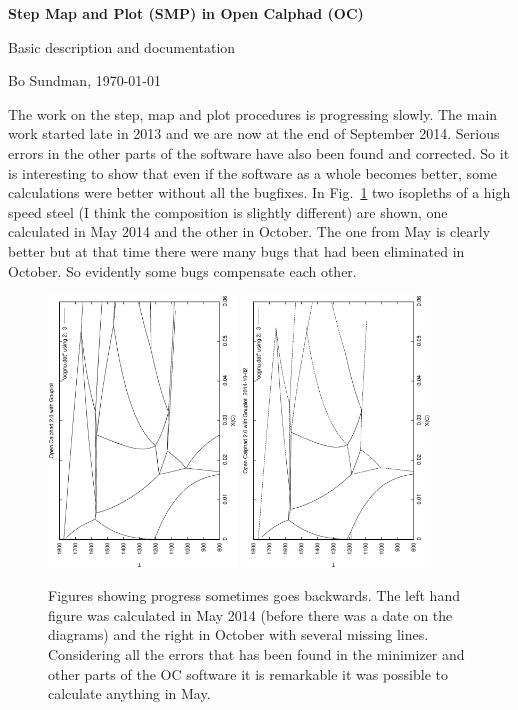\documentclass[12pt]{article}
\begin{document}
\begin{center}

{\Large \bf Step Map and Plot (SMP) in Open Calphad (OC)}

{\large Basic description and documentation}

Bo Sundman, \today

\end{center}

The work on the step, map and plot procedures is progressing slowly.
The main work started late in 2013 and we are now at the end of
September 2014.  Serious errors in the other parts of the software
have also been found and corrected.  So it is interesting to show that
even if the software as a whole becomes better, some calculations were
better without all the bugfixes.  In Fig.~\ref{fg:hss} two isopleths
of a high speed steel (I think the composition is slightly different)
are shown, one calculated in May 2014 and the other in October.  The
one from May is clearly better but at that time there were many bugs
that had been eliminated in October.  So evidently some bugs
compensate each other.
\begin{figure}[!h]
\includegraphics[width=50mm,angle=-90]{figs/oc-hss-140513.ps}
\includegraphics[width=50mm,angle=-90]{figs/oc-hss-141002.ps}
\caption{Figures showing progress sometimes goes backwards.  The left
  hand figure was calculated in May 2014 (before there was a date on
  the diagrams) and the right in October with several missing lines.
  Considering all the errors that has been found in the minimizer and
  other parts of the OC software it is remarkable it was possible to
  calculate anything in May.}\label{fg:hss}
\end{figure}
\end{document}
